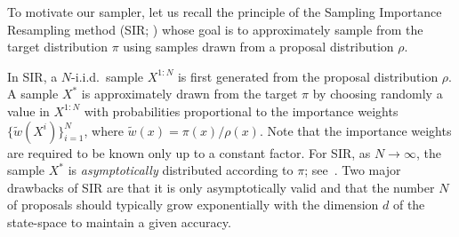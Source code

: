 \documentclass{article}
\def\iid{i.i.d.}
\newcommand{\1}{\mathds{1}}
\def\iid{i.i.d.}
\def\target{\pi}
\def\proposal{\rho}
\def\weightfunc{\tilde{w}}
\newcommand{\chunku}[3]{#1^{#2:#3}}
\begin{document}
To motivate our sampler, let us recall the principle of the Sampling Importance Resampling method (SIR; \cite{rubin1987comment,smith1992bayesian}) whose goal is to approximately sample from the target distribution $\target$ using samples drawn from a proposal distribution $\proposal$.

In SIR, a $N$-\iid\ sample $\chunku{X}{1}{N}$ is first generated from the proposal distribution $\proposal$. A sample $X^*$ is approximately drawn from the target $\target$ by choosing randomly a value in $\chunku{X}{1}{N}$ with probabilities proportional to the importance weights $\{\weightfunc(X^i)\}_{i = 1}^N$, where $\weightfunc(x)= \target(x)/\proposal(x)$. Note that the importance weights are required to be known only up to a constant factor.  For SIR, as $N \to \infty$, the sample $X^*$ is \emph{asymptotically} distributed according to $\target$; see~\cite{smith1992bayesian}. Two major drawbacks of SIR are that it is only asymptotically valid and that the number $N$ of proposals should typically grow exponentially with the dimension $d$ of the state-space to maintain a given accuracy.
\end{document}
